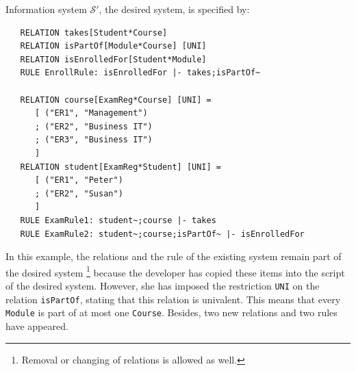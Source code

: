 \documentclass[runningheads]{llncs}
\newcommand{\infsys}{\mathscr{S}}
\begin{document}
   Information system $\infsys'$, the desired system, is specified by:
\begin{verbatim}
   RELATION takes[Student*Course]
   RELATION isPartOf[Module*Course] [UNI]
   RELATION isEnrolledFor[Student*Module]
   RULE EnrollRule: isEnrolledFor |- takes;isPartOf~
   
   RELATION course[ExamReg*Course] [UNI] =
      [ ("ER1", "Management")
      ; ("ER2", "Business IT")
      ; ("ER3", "Business IT")
      ]
   RELATION student[ExamReg*Student] [UNI] =
      [ ("ER1", "Peter")
      ; ("ER2", "Susan")
      ]
   RULE ExamRule1: student~;course |- takes
   RULE ExamRule2: student~;course;isPartOf~ |- isEnrolledFor
\end{verbatim}
   In this example, the relations and the rule of the existing system remain part of the desired system%
\footnote{Removal or changing of relations is allowed as well.}
   because the developer has copied these items into the script of the desired system.
   However, she has imposed the restriction \verb-UNI- on the relation {\tt isPartOf}, stating that this relation is univalent.
   This means that every \verb-Module- is part of at most one \verb-Course-.
   Besides, two new relations and two rules have appeared.
\end{document}
